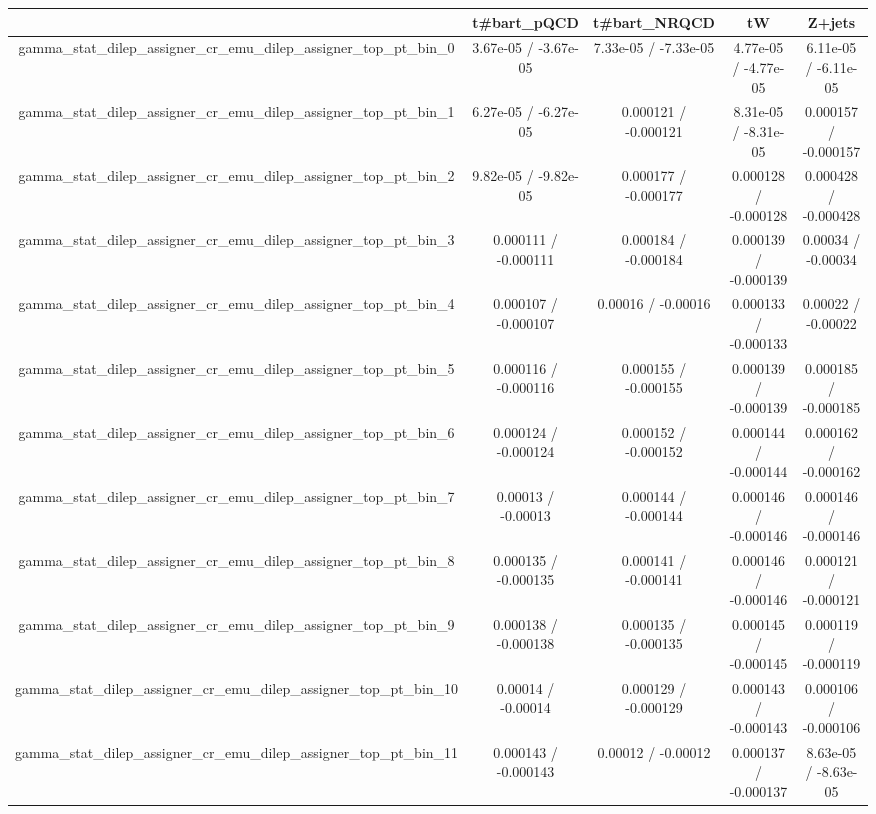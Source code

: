 \documentclass[10pt]{article}
\begin{document}
\begin{table}[htbp]
\begin{center}
\begin{tabular}{|c|c|c|c|c|}
\hline 
      & t#bar{t}_{pQCD}      & t#bar{t}_{NRQCD}      & tW      & Z+jets \\ 
\hline 
  gamma_stat_dilep_assigner_cr_emu_dilep_assigner_top_pt_bin_0 & 3.67e-05 / -3.67e-05 & 7.33e-05 / -7.33e-05 & 4.77e-05 / -4.77e-05 & 6.11e-05 / -6.11e-05 \\ 
  gamma_stat_dilep_assigner_cr_emu_dilep_assigner_top_pt_bin_1 & 6.27e-05 / -6.27e-05 & 0.000121 / -0.000121 & 8.31e-05 / -8.31e-05 & 0.000157 / -0.000157 \\ 
  gamma_stat_dilep_assigner_cr_emu_dilep_assigner_top_pt_bin_2 & 9.82e-05 / -9.82e-05 & 0.000177 / -0.000177 & 0.000128 / -0.000128 & 0.000428 / -0.000428 \\ 
  gamma_stat_dilep_assigner_cr_emu_dilep_assigner_top_pt_bin_3 & 0.000111 / -0.000111 & 0.000184 / -0.000184 & 0.000139 / -0.000139 & 0.00034 / -0.00034 \\ 
  gamma_stat_dilep_assigner_cr_emu_dilep_assigner_top_pt_bin_4 & 0.000107 / -0.000107 & 0.00016 / -0.00016 & 0.000133 / -0.000133 & 0.00022 / -0.00022 \\ 
  gamma_stat_dilep_assigner_cr_emu_dilep_assigner_top_pt_bin_5 & 0.000116 / -0.000116 & 0.000155 / -0.000155 & 0.000139 / -0.000139 & 0.000185 / -0.000185 \\ 
  gamma_stat_dilep_assigner_cr_emu_dilep_assigner_top_pt_bin_6 & 0.000124 / -0.000124 & 0.000152 / -0.000152 & 0.000144 / -0.000144 & 0.000162 / -0.000162 \\ 
  gamma_stat_dilep_assigner_cr_emu_dilep_assigner_top_pt_bin_7 & 0.00013 / -0.00013 & 0.000144 / -0.000144 & 0.000146 / -0.000146 & 0.000146 / -0.000146 \\ 
  gamma_stat_dilep_assigner_cr_emu_dilep_assigner_top_pt_bin_8 & 0.000135 / -0.000135 & 0.000141 / -0.000141 & 0.000146 / -0.000146 & 0.000121 / -0.000121 \\ 
  gamma_stat_dilep_assigner_cr_emu_dilep_assigner_top_pt_bin_9 & 0.000138 / -0.000138 & 0.000135 / -0.000135 & 0.000145 / -0.000145 & 0.000119 / -0.000119 \\ 
  gamma_stat_dilep_assigner_cr_emu_dilep_assigner_top_pt_bin_10 & 0.00014 / -0.00014 & 0.000129 / -0.000129 & 0.000143 / -0.000143 & 0.000106 / -0.000106 \\ 
  gamma_stat_dilep_assigner_cr_emu_dilep_assigner_top_pt_bin_11 & 0.000143 / -0.000143 & 0.00012 / -0.00012 & 0.000137 / -0.000137 & 8.63e-05 / -8.63e-05 \\ 

\end{tabular}
\end{center}
\end{table}
\end{document}

